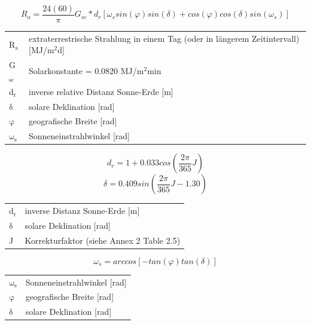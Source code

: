 \begin{description}
\begin{equation}
\label{eq:Ra_long_period}
R_{a}=\frac{24 (60)}{\pi}G_{sc}*d_{r}[\omega _{s}sin(\varphi)sin(\delta)+cos(\varphi)cos(\delta)sin(\omega _{s})]
\end{equation}
\begin{table}[H]
\centering
\begin{tabular}{ll}
R$\mathrm{_{a}}$ & extraterrestrische Strahlung in einem Tag (oder in längerem Zeitintervall) [MJ/m$\mathrm{^{2}}$d]\\
G$\mathrm{_{sc}}$ & Solarkonstante = 0.0820 MJ/m$\mathrm{^{2}}$min\\
d$\mathrm{_{r}}$ & inverse relative Distanz Sonne-Erde [m]\\
$\mathrm{\delta}$ & solare Deklination [rad]\\
$\mathrm{\varphi}$ & geografische Breite [rad]\\
$\mathrm{\omega_{s}}$ & Sonneneinstrahlwinkel [rad]\\
\end{tabular}
\end{table}

\begin{equation}
\label{eq:dr}
d_r=1+0.033cos\left(\frac{2\pi}{365}J\right)
\end{equation}
\begin{equation}
\label{eq:delta_radiation}
\delta=0.409sin\left(\frac{2\pi}{365}J-1.30\right)
\end{equation}
\begin{table}[H]
\centering
\begin{tabular}{ll}
$\mathrm{d_r}$ & inverse Distanz Sonne-Erde [m]\\
$\mathrm{\delta}$ & solare Deklination [rad]\\
J & Korrekturfaktor (siehe \cite{fao} Annex 2 Table 2.5)\\
\end{tabular}
\end{table}

\begin{equation}
\label{eq:omega_s}
\omega_s=arccos[-tan(\varphi)tan(\delta)]
\end{equation}
\begin{table}[H]
\centering
\begin{tabular}{ll}
$\mathrm{\omega_s}$ & Sonneneinstrahlwinkel [rad]\\
$\mathrm{\varphi}$ & geografische Breite [rad]\\
$\mathrm{\delta}$ & solare Deklination [rad]\\
\end{tabular}
\end{table}


\end{description}

